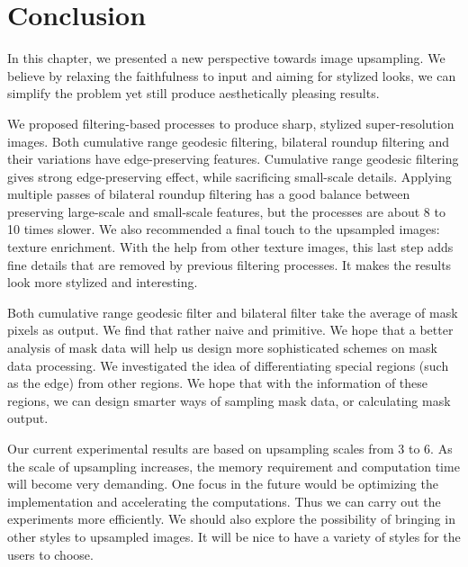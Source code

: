 \section{Conclusion}\label{sec:conclusion}

In this chapter, we presented a new perspective towards image upsampling. We believe by relaxing the faithfulness to input and aiming for stylized looks, we can simplify the problem yet still produce aesthetically pleasing results. 

We proposed filtering-based processes to produce sharp, stylized super-resolution images. Both cumulative range geodesic filtering, bilateral roundup filtering and their variations have edge-preserving features. Cumulative range geodesic filtering gives strong edge-preserving effect, while sacrificing small-scale details. Applying multiple passes of bilateral roundup filtering has a good balance between preserving large-scale and small-scale features, but the processes are about 8 to 10 times slower. We also recommended a final touch to the upsampled images: texture enrichment. With the help from other texture images, this last step adds fine details that are removed by previous filtering processes. It makes the results look more stylized and interesting.

Both cumulative range geodesic filter and bilateral filter take the average of mask pixels as output. We find that rather naive and primitive. We hope that a better analysis of mask data will help us design more sophisticated schemes on mask data processing. We investigated the idea of differentiating special regions (such as the edge) from other regions. We hope that with the information of these regions, we can design smarter ways of sampling mask data, or calculating mask output.

Our current experimental results are based on upsampling scales from 3 to 6. As the scale of upsampling increases, the memory requirement and computation time will become very demanding. One focus in the future would be optimizing the implementation and accelerating the computations. Thus we can carry out the experiments more efficiently. We should also explore the possibility of bringing in other styles to upsampled images. It will be nice to have a variety of styles for the users to choose.


